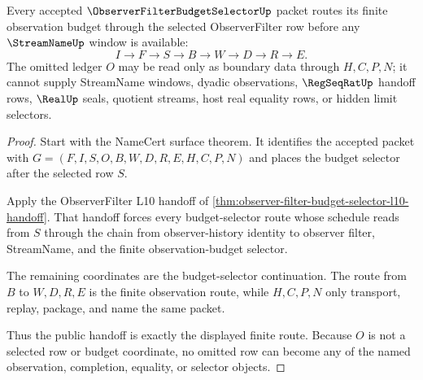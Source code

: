 \begin{theorem}
\label{thm:observer-filter-budget-selector-streamname-handoff}
Every accepted $\ObserverFilterBudgetSelectorUp$ packet routes its finite observation budget through the selected ObserverFilter row before any $\StreamNameUp$ window is available:
$$
I \to F \to S \to B \to W \to D \to R \to E.
$$
The omitted ledger $O$ may be read only as boundary data through $H,C,P,N$; it cannot supply StreamName windows, dyadic observations, $\RegSeqRatUp$ handoff rows, $\RealUp$ seals, quotient streams, host real equality rows, or hidden limit selectors.
\end{theorem}
\begin{proof}
Start with the NameCert surface theorem. It identifies the accepted packet with $G=(F,I,S,O,B,W,D,R,E,H,C,P,N)$ and places the budget selector after the selected row $S$.

Apply the ObserverFilter L10 handoff of \autoref{thm:observer-filter-budget-selector-l10-handoff}. That handoff forces every budget-selector route whose schedule reads from $S$ through the chain from observer-history identity to observer filter, StreamName, and the finite observation-budget selector.

The remaining coordinates are the budget-selector continuation. The route from $B$ to $W,D,R,E$ is the finite observation route, while $H,C,P,N$ only transport, replay, package, and name the same packet.

Thus the public handoff is exactly the displayed finite route. Because $O$ is not a selected row or budget coordinate, no omitted row can become any of the named observation, completion, equality, or selector objects.
\end{proof}

